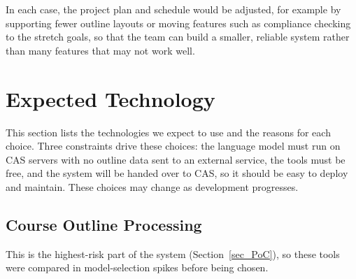 \documentclass{article}
\begin{document}
\noindent In each case, the project plan and schedule would be adjusted, for
example by supporting fewer outline layouts or moving features such as
compliance checking to the stretch goals, so that the team can build a
smaller, reliable system rather than many features that may not work well.

\section{Expected Technology}

This section lists the technologies we expect to use and the reasons for each
choice. Three constraints drive these choices: the language model must run on
CAS servers with no outline data sent to an external service, the tools must be
free, and the system will be handed over to CAS, so it should be easy to deploy
and maintain. These choices may change as development progresses.

\subsection{Course Outline Processing}

This is the highest-risk part of the system (Section~\ref{sec_PoC}), so these tools were compared in model-selection spikes
before being chosen.
\end{document}
